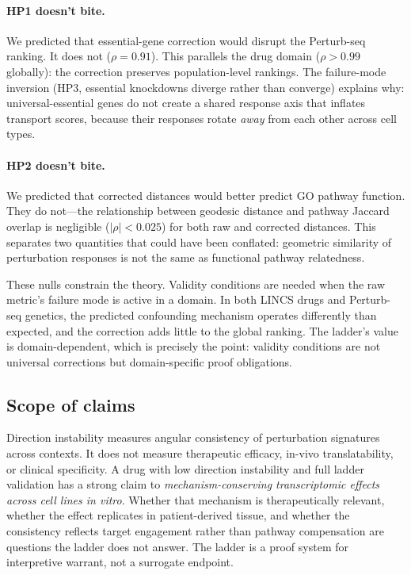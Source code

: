 \documentclass{article}
\begin{document}
\paragraph{HP1 doesn't bite.}
We predicted that essential-gene correction would disrupt the Perturb-seq
ranking. It does not ($\rho = 0.91$). This parallels the drug domain ($\rho
> 0.99$ globally): the correction preserves population-level rankings. The
failure-mode inversion
(HP3, essential knockdowns diverge rather than converge) explains why:
universal-essential genes do not create a shared response axis that inflates
transport scores, because their responses rotate \emph{away} from each other
across cell types.

\paragraph{HP2 doesn't bite.}
We predicted that corrected distances would better predict GO pathway
function. They do not---the relationship between geodesic distance and
pathway Jaccard overlap is negligible ($|\rho| < 0.025$) for both raw and
corrected distances. This separates two quantities that could have been
conflated: geometric similarity of perturbation responses is not the same as
functional pathway relatedness.

These nulls constrain the theory. Validity conditions are needed when the raw
metric's failure mode is active in a domain. In both LINCS drugs and
Perturb-seq genetics, the predicted confounding mechanism operates differently
than expected, and the correction adds little to the global ranking. The
ladder's value is domain-dependent, which is precisely the point: validity
conditions are not universal corrections but domain-specific proof obligations.

\subsection{Scope of claims}

Direction instability measures angular consistency of perturbation signatures
across contexts. It does not measure therapeutic efficacy, in-vivo
translatability, or clinical specificity. A drug with low direction
instability and full ladder validation has a strong claim to
\emph{mechanism-conserving transcriptomic effects across cell lines in
vitro}. Whether that mechanism is therapeutically relevant, whether the
effect replicates in patient-derived tissue, and whether the consistency
reflects target engagement rather than pathway compensation are questions
the ladder does not answer. The ladder is a proof system for
interpretive warrant, not a surrogate endpoint.
\end{document}
